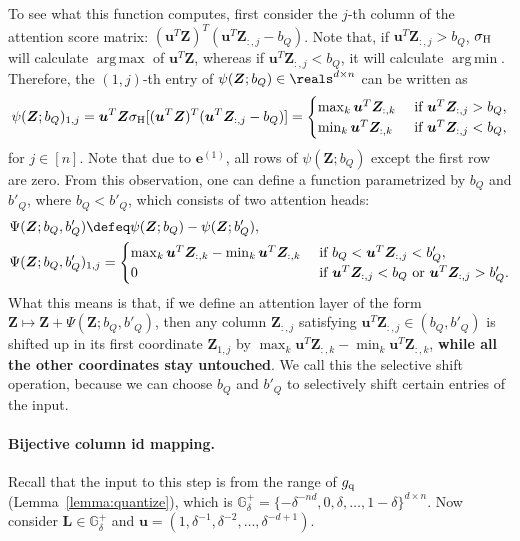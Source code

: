 \documentclass{article} %
\def\ve{{\bm{e}}}
\def\vu{{\bm{u}}}
\def\mL{{\bm{L}}}
\def\mZ{{\bm{Z}}}
\def\sG{{\mathbb{G}}}
\DeclareMathOperator*{\argmax}{arg\,max}
\DeclareMathOperator*{\argmin}{arg\,min}
\newcommand{\hdmx}{\sigma_{\rm H}}
\begin{document}
To see what this function computes, first consider the $j$-th column of the attention score matrix: $(\vu^T \mZ)^T (\vu^T \mZ_{:,j} - b_Q)$. Note that, if $\vu^T \mZ_{:,j}>b_Q$, $\hdmx$ will calculate $\argmax$ of $\vu^T \mZ$, whereas if $\vu^T \mZ_{:,j}<b_Q$, it will calculate $\argmin$. Therefore, the $(1,j)$-th entry of $\psi(\mZ; b_Q) \in \reals^{d \times n}$ can be written as
\begin{equation*}
\psi(\mZ; b_Q)_{1, j} = 
\vu^T \mZ \hdmx [ (\vu^T \mZ)^T (\vu^T \mZ_{:,j} - b_Q) ] =
\begin{cases}
    \max_k \vu^T \mZ_{:,k} & \text{ if } \vu^T \mZ_{:,j} > b_Q, \\
    \min_k \vu^T \mZ_{:,k} & \text{ if } \vu^T \mZ_{:,j} < b_Q,
\end{cases}
\end{equation*}
for $j \in [n]$. Note that due to $\ve^{(1)}$, all rows of $\psi(\mZ; b_Q)$ except the first row are zero.
From this observation, one can define a function parametrized by $b_Q$ and $b'_Q$, where $b_Q < b'_Q$, which consists of two attention heads:
\begin{align*}
    &\Psi(\mZ; b_Q, b'_Q) \defeq \psi(\mZ; b_Q) - \psi(\mZ; b'_Q),\\
    &\Psi(\mZ; b_Q, b'_Q)_{1, j} =
    \begin{cases}
        \max_k \vu^T \mZ_{:,k} - \min_k \vu^T \mZ_{:,k} & \text{ if } b_Q < \vu^T \mZ_{:,j} < b'_Q, \\
        0 & \text{ if } \vu^T \mZ_{:,j} < b_Q \text{ or } \vu^T \mZ_{:,j} > b'_Q.
    \end{cases}
\end{align*}
What this means is that, if we define an attention layer of the form $\mZ \mapsto \mZ + \Psi(\mZ;b_Q,b'_Q)$, then any column $\mZ_{:,j}$ satisfying $\vu^T \mZ_{:,j} \in (b_Q,b'_Q)$ is shifted up in its first coordinate $\mZ_{1,j}$ by $\max_k \vu^T \mZ_{:,k} - \min_k \vu^T \mZ_{:,k}$, \textbf{while all the other coordinates stay untouched}. We call this the selective shift operation, because we can choose $b_Q$ and $b'_Q$ to selectively shift certain entries of the input.

\paragraph{Bijective column id mapping.}
Recall that the input to this step is from the range of $g_{\rm q}$ (Lemma~\ref{lemma:quantize}), which is $\sG^+_{\delta} = \{ -\delta^{-nd}, 0, \delta, \dots, 1-\delta \}^{d \times n}$. Now consider $\mL \in \sG^+_{\delta}$ and $\vu = (1, \delta^{-1}, \delta^{-2}, \dots, \delta^{-d+1})$.
\end{document}
